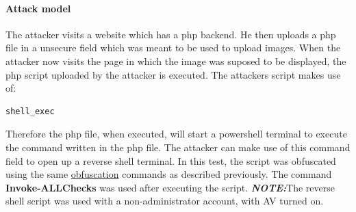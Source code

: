 \documentclass{article}%
\begin{document}
\paragraph{Attack model}\hfill
\newline
The attacker visits a website which has a php backend. He then uploads a php file in a unsecure field which was meant to be used to upload images. When the attacker now visits the page in which the image was suposed to be displayed, the php script uploaded by the attacker is executed. The attackers script makes use of:
\begin{verbatim}shell_exec\end{verbatim}
Therefore the php file, when executed, will start a powershell terminal to execute the command written in the php file. The attacker can make use of this command field to open up a reverse shell terminal. In this test, the script was obfuscated using the same \hyperlink{obfuscation}{obfuscation} commands as described previously. The command \textbf{Invoke-ALLChecks} was used after executing the script. 
\newline\newline
\textit{\textbf{NOTE:}}The reverse shell script was used with a non-administrator account, with AV turned on.
\newline
\end{document}
